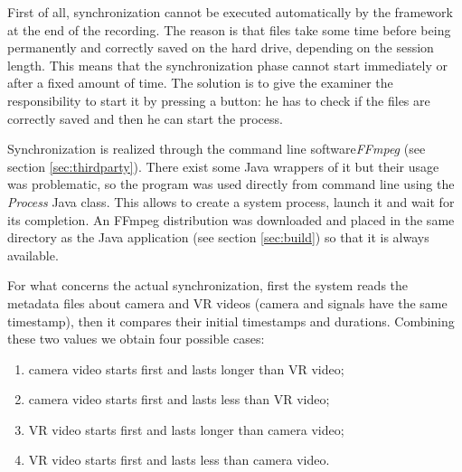 \documentclass[binding=0.6cm,LaM]{sapthesis}
\begin{document}
First of all, synchronization cannot be executed automatically by the framework at the end of the recording. The reason is that files take some time before being permanently and correctly saved on the hard drive, depending on the session length. This means that the synchronization phase cannot start immediately or after a fixed amount of time. The solution is to give the examiner the responsibility to start it by pressing a button: he has to check if the files are correctly saved and then he can start the process. 

Synchronization is realized through the command line software\textit{FFmpeg} (see section \ref{sec:thirdparty}). There exist some Java wrappers of it but their usage was problematic, so the program was used directly from command line using the \textit{Process} Java class. This allows to create a system process, launch it and wait for its completion. An FFmpeg distribution was downloaded and placed in the same directory as the Java application (see section \ref{sec:build}) so that it is always available.

For what concerns the actual synchronization, first the system reads the metadata files about camera and VR videos (camera and signals have the same timestamp), then it compares their initial timestamps and durations. Combining these two values we obtain four possible cases:

\begin{enumerate}

\item camera video starts first and lasts longer than VR video;

\item camera video starts first and lasts less than VR video;

\item VR video starts first and lasts longer than camera video;

\item VR video starts first and lasts less than camera video.

\end{enumerate}
\end{document}
